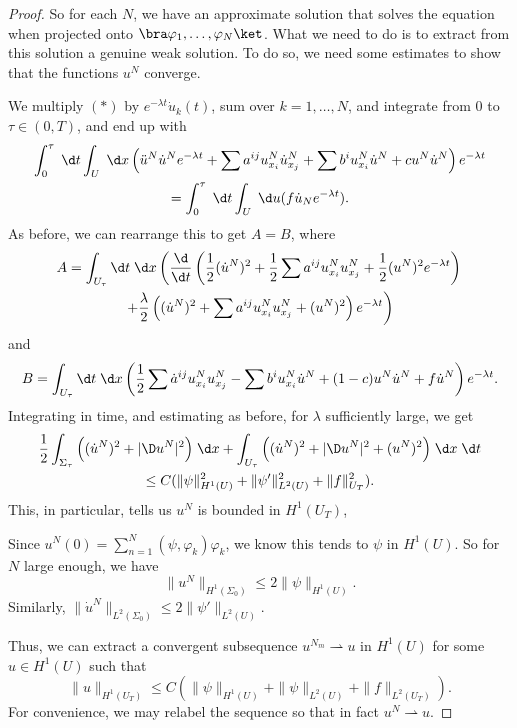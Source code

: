 \documentclass[a4paper]{article}
\begin{document}
\begin{proof}
  So for each $N$, we have an approximate solution that solves the equation when projected onto $\bra \varphi_1, \ldots, \varphi_N\ket$. What we need to do is to extract from this solution a genuine weak solution. To do so, we need some estimates to show that the functions $u^N$ converge.

  We multiply $(*)$ by $e^{-\lambda t} \dot{u}_k(t)$, sum over $k = 1, \ldots, N$, and integrate from $0$ to $\tau \in (0, T)$, and end up with
  \begin{multline*}
    \int_0^\tau \;\d t \int_U \;\d x \left(\ddot{u}^N \dot{u}^N e^{-\lambda t} + \sum a^{ij} u_{x_i}^N \dot{u}_{x_j}^N + \sum b^i u_{x_i}^N \dot{u}^N + c u^N \dot{u}^N\right)e^{-\lambda t}\\
    = \int_0^\tau \;\d t \int_U \;\d u (f \dot{u}_N e^{-\lambda t}).
  \end{multline*}
  As before, we can rearrange this to get $A = B$, where
  \begin{multline*}
    A = \int_{U_\tau}\d t \;\d x \left(\frac{\d}{\d t} \left(\frac{1}{2} (\dot{u}^N)^2 + \frac{1}{2} \sum a^{ij} u_{x_i}^N u_{x_j}^N + \frac{1}{2} (u^N)^2 e^{-\lambda t}\right)\right.\\
    \left.+ \frac{\lambda}{2} \left((\dot{u}^N)^2 + \sum a^{ij} u_{x_i}^N u_{x_j}^N + (u^N)^2 \right)e^{-\lambda t}\right)
  \end{multline*}
  and
  \[
    B = \int_{U_\tau} \d t\;\d x\left( \frac{1}{2} \sum \dot{a}^{ij} u_{x_i}^N u_{x_j}^N - \sum b^i u_{x_i}^N \dot{u}^N + (1 - c) u^N \dot{u}^N + f \dot{u}^N \right)e^{-\lambda t}.
  \]
  Integrating in time, and estimating as before, for $\lambda$ sufficiently large, we get
  \begin{multline*}
    \frac{1}{2} \int_{\Sigma_\tau} \Big((\dot{u}^N)^2 + |\D u^N|^2\Big) \;\d x + \int_{U_\tau} \Big((\dot{u}^N)^2 + |\D u^N|^2 + (u^N)^2\Big) \;\d x\;\d t\\
    \leq C (\|\psi\|^2_{H^1(U)} + \|\psi'\|^2_{L^2(U)} + \|f\|_{U_T}^2).
  \end{multline*}
  This, in particular, tells us $u^N$ is bounded in $H^1(U_T)$,

  Since $u^N(0) = \sum_{n = 1}^N (\psi, \varphi_k) \varphi_k$, we know this tends to $\psi$ in $H^1(U)$. So for $N$ large enough, we have
  \[
    \|u^N\|_{H^1(\Sigma_0)} \leq 2 \|\psi\|_{H^1(U)}.
  \]
  Similarly, $\|\dot{u}^N\|_{L^2(\Sigma_0)} \leq 2 \|\psi'\|_{L^2(U)}$.

  Thus, we can extract a convergent subsequence $u^{N_m} \rightharpoonup u$ in $H^1(U)$ for some $u \in H^1(U)$ such that %
  \[
    \|u\|_{H^1(U_T)} \leq C (\|\psi\|_{H^1(U)} + \|\psi\|_{L^2(U)} + \|f\|_{L^2(U_T)}).
  \]
  For convenience, we may relabel the sequence so that in fact $u^N \rightharpoonup u$.


\end{proof}
\end{document}
